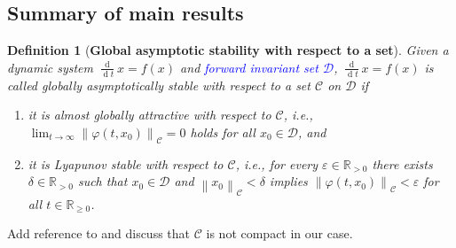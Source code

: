 \documentclass[twocolumn,twoside,journal]{IEEEtran}
\DeclareMathOperator{\diff}{d}
\newcommand{\mc}{\mathcal}
\newcommand{\ddt}{\tfrac{\diff}{\diff \!t}}
\newcommand{\norm}[1]{\left \lVert #1 \right \rVert}
\newcommand\blue[1]{{\color{blue}#1}}
\newtheorem{definition}{Definition}
\begin{document}
\subsection{Summary of main results}
\begin{definition}[\textbf{Global asymptotic stability with respect to a set}]\label{def:GAS}
Given a dynamic system $\ddt x = f(x)$ and \textcolor{blue}{forward invariant set $\mc D$}, $\ddt x = f(x)$ is called globally asymptotically stable with respect to a set $\mc C$ on $\mc D$ if 
\begin{enumerate}[label=(\roman*)]
 \item it is almost globally attractive with respect to $\mc C$, i.e., $
     \lim_{t\to\infty} \norm{\varphi(t,x_0)}_{\mc C} = 0$ holds for all $x_0 \in \mc D$, and \label{def:GAS:attr}
        \item it is Lyapunov stable with respect to $\mc C$, i.e., for every $\varepsilon \in \mathbb{R}_{>0}$ there exists $\delta \in \mathbb{R}_{>0}$ such that $x_0 \in \mc D$ and $\norm{x_0}_{\mc C} < \delta$ implies $\norm{\varphi(t,x_0)}_{\mc C} < \varepsilon$ for all $t \in \mathbb{R}_{\geq 0}$.\label{def:GAS:stab}
\end{enumerate}
\end{definition}

\blue{Add reference to \cite{A2004} and discuss that $\mc C$ is not compact in our case.}
\end{document}
